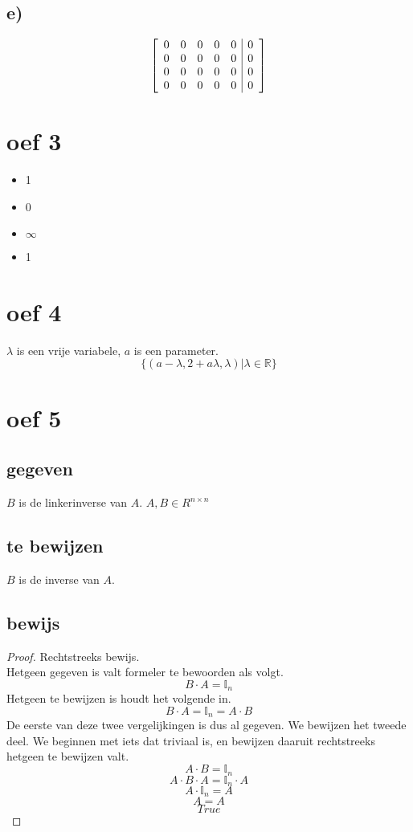 \documentclass[lineaire_algebra_oplossingen.tex]{subfiles}
\begin{document}
\subsection*{e)}
\[
\left[
\begin{array}{l l l l l | r}
0 & 0 & 0 & 0 & 0 & 0\\
0 & 0 & 0 & 0 & 0 & 0\\
0 & 0 & 0 & 0 & 0 & 0\\
0 & 0 & 0 & 0 & 0 & 0\\
\end{array}
\right]
\]

\section{oef 3}
\begin{itemize}
\item 1
\item 0
\item $\infty$
\item 1
\end{itemize}

\section{oef 4}
$\lambda$ is een vrije variabele, $a$ is een parameter.
\[
\{(a-\lambda, 2+a\lambda, \lambda) | \lambda \in \mathbb{R}\}
\]

\section{oef 5}
\subsection*{gegeven}
$B$ is de linkerinverse van $A$. $A,B \in R^{n\times n}$
\subsection*{te bewijzen}
$B$ is de inverse van $A$.
\subsection*{bewijs}
\begin{proof}
Rechtstreeks bewijs.\\
Hetgeen gegeven is valt formeler te bewoorden als volgt.
\[
B\cdot A = \mathbb{I}_n
\]
Hetgeen te bewijzen is houdt het volgende in.
\[
B\cdot A = \mathbb{I}_n = A \cdot B
\]
De eerste van deze twee vergelijkingen is dus al gegeven.
We bewijzen het tweede deel. We beginnen met iets dat triviaal is, en bewijzen daaruit rechtstreeks hetgeen te bewijzen valt.\\
\[A\cdot B = \mathbb{I}_n\]
\[A\cdot B \cdot A = \mathbb{I}_n \cdot A\]
\[A\cdot\mathbb{I}_n = A\]
\[A = A\]
\[True\]
\end{proof}
\end{document}
